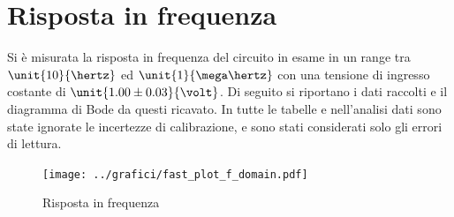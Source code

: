 \documentclass[10pt,a4paper]{article}
\begin{document}
\section{Risposta in frequenza}

Si è misurata la risposta in frequenza del circuito in esame in un range tra $\unit{10}{\hertz}$ ed $\unit{1}{\mega\hertz}$ con una tensione di ingresso costante di $\unit{1.00 \pm 0.03}{\volt}$. Di seguito si riportano i dati raccolti e il diagramma di Bode da questi ricavato. In tutte le tabelle e nell'analisi dati sono state ignorate le incertezze di calibrazione, e sono stati considerati solo gli errori di lettura.

\begin{figure}[h!]
	\centering
	\begin{minipage}[c]{0.3\textwidth}
		\centering
		\resizebox{\textwidth}{!}{
			}
	\end{minipage}
	\begin{minipage}[c]{0.69\textwidth}
		\centering
		\texttt{[image: ../grafici/fast\_plot\_f\_domain.pdf]}
		\caption{Risposta in frequenza}
		\label{early}
	\end{minipage}
\end{figure}
\end{document}
